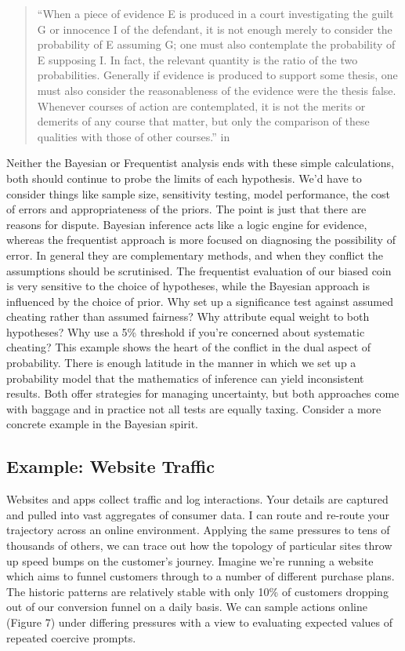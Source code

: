 \documentclass[
]{book}
\theoremstyle{definition}
\theoremstyle{definition}
\theoremstyle{definition}
\theoremstyle{remark}
\begin{document}
\begin{quote}
``When a piece of evidence E is produced in a court investigating the guilt G or innocence I of the defendant, it is not enough merely to consider the probability of E assuming G; one must also contemplate the probability of E supposing I. In fact, the relevant quantity is the ratio of the two probabilities. Generally if evidence is produced to support some thesis, one must also consider the reasonableness of the evidence were the thesis false. Whenever courses of action are contemplated, it is not the merits or demerits of any course that matter, but only the comparison of these qualities with those of other courses.'' in \citep{LindleyTea}
\end{quote}

Neither the Bayesian or Frequentist analysis ends with these simple calculations, both should continue to probe the limits of each hypothesis. We'd have to consider things like sample size, sensitivity testing, model performance, the cost of errors and appropriateness of the priors. The point is just that there are reasons for dispute. Bayesian inference acts like a logic engine for evidence, whereas the frequentist approach is more focused on diagnosing the possibility of error. In general they are complementary methods, and when they conflict the assumptions should be scrutinised. The frequentist evaluation of our biased coin is very sensitive to the choice of hypotheses, while the Bayesian approach is influenced by the choice of prior. Why set up a significance test against assumed cheating rather than assumed fairness? Why attribute equal weight to both hypotheses? Why use a 5\% threshold if you're concerned about systematic cheating? This example shows the heart of the conflict in the dual aspect of probability. There is enough latitude in the manner in which we set up a probability model that the mathematics of inference can yield inconsistent results. Both offer strategies for managing uncertainty, but both approaches come with baggage and in practice not all tests are equally taxing. Consider a more concrete example in the Bayesian spirit.

\hypertarget{example-website-traffic}{%
\subsection{Example: Website Traffic}\label{example-website-traffic}}

Websites and apps collect traffic and log interactions. Your details are captured and pulled into vast aggregates of consumer data. I can route and re-route your trajectory across an online environment. Applying the same pressures to tens of thousands of others, we can trace out how the topology of particular sites throw up speed bumps on the customer's journey. Imagine we're running a website which aims to funnel customers through to a number of different purchase plans. The historic patterns are relatively stable with only 10\% of customers dropping out of our conversion funnel on a daily basis. We can sample actions online (Figure 7) under differing pressures with a view to evaluating expected values of repeated coercive prompts.
\end{document}
